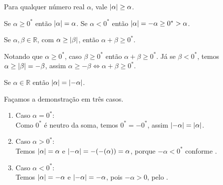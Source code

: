 \documentclass[../main.tex]{subfiles}
\begin{document}
\begin{prop}
    Para qualquer número real $\alpha$, vale $\abs{\alpha} \geq \alpha$.
\end{prop}
\begin{dem}
    Se $\alpha \geq 0^*$ então $\abs{\alpha} = \alpha$. 
    Se $\alpha < 0^*$ então $\abs{\alpha} = -\alpha \geq 0^* > \alpha$.
\end{dem}
\begin{prop}\label{reais-prop-somaMod}
    Se $\alpha, \beta \in \mathbb{R}$, com $\alpha \geq \abs{\beta}$, então $\alpha + \beta \geq 0^*$.
\end{prop}
\begin{dem}
    Notando que $\alpha \geq 0^*$, caso $\beta \geq 0^*$ então $\alpha + \beta \geq 0^*$. Já se $\beta < 0^*$, temos $\alpha \geq \abs{\beta} = -\beta$, assim $\alpha \geq -\beta \iff \alpha + \beta \geq 0^*$.
\end{dem}

\begin{prop}\label{reais-prop-moduloDoMenos}
    Se $\alpha \in \mathbb{R}$ então $\abs{\alpha} = \abs{-\alpha}$.
\end{prop}
\begin{dem}
    Façamos a demonstração em três casos.
    \begin{enumerate}[label=(\roman*)]
        \item Caso $\alpha = 0^*$: \\
        Como $0^*$ é neutro da soma, temos $0^* = -0^*$, assim $\abs{-\alpha} = \abs{\alpha}$.
        \item Caso $\alpha > 0^*$: \\
        Temos $\abs{\alpha} = \alpha$ e $\abs{-\alpha} = -(-(\alpha)) = \alpha$, porque $-\alpha < 0^*$ conforme .
        \item Caso $\alpha < 0^*$: \\
        Temos $\abs{\alpha} = -\alpha$ e $\abs{-\alpha} = -\alpha$, pois $-\alpha > 0$, pelo .
    \end{enumerate}
\end{dem}
\end{document}
